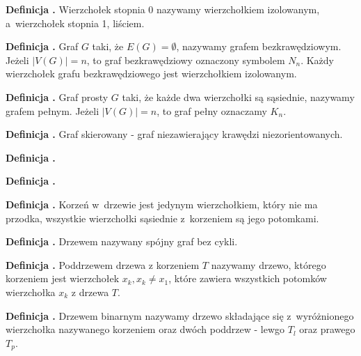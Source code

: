 \noindent
\textbf{Definicja .}
\incrementdefinitionIndex
Wierzchołek stopnia 0 nazywamy wierzchołkiem izolowanym, a~wierzchołek stopnia 1, liściem.

\noindent
\textbf{Definicja .}
\incrementdefinitionIndex
Graf $G$ taki, że $E(G) = \emptyset$, nazywamy grafem bezkrawędziowym. Jeżeli $|V(G)| = n$, to graf bezkrawędziowy oznaczony symbolem $N_n$.
Każdy wierzchołek grafu bezkrawędziowego jest wierzchołkiem izolowanym.

\noindent
\textbf{Definicja .}
\incrementdefinitionIndex
Graf prosty $G$ taki, że każde dwa wierzchołki są sąsiednie, nazywamy grafem pełnym.
Jeżeli $|V(G)| = n$, to graf pełny oznaczamy $K_n$.

\noindent
\textbf{Definicja .}
\incrementdefinitionIndex
Graf skierowany - graf niezawierający krawędzi niezorientowanych.

\noindent
\textbf{Definicja .}
\incrementdefinitionIndex

\noindent
\textbf{Definicja .}
\incrementdefinitionIndex

\noindent
\textbf{Definicja .}
\incrementdefinitionIndex
Korzeń w~drzewie jest jedynym wierzchołkiem,
który nie ma przodka, wszystkie wierzchołki sąsiednie z~korzeniem są jego potomkami.

\noindent
\textbf{Definicja .}
\incrementdefinitionIndex
Drzewem nazywany spójny graf bez cykli.

\noindent
\textbf{Definicja .}
\incrementdefinitionIndex
Poddrzewem drzewa z korzeniem $T$ nazywamy drzewo, którego korzeniem jest wierzchołek $x_k, x_k \neq x_1$,
które zawiera wszystkich potomków wierzchołka $x_k$ z drzewa $T$.

\noindent
\textbf{Definicja .}
\incrementdefinitionIndex
Drzewem binarnym nazywamy drzewo składające się z~wyróżnionego wierzchołka nazywanego korzeniem oraz dwóch poddrzew
- lewgo $T_l$ oraz prawego $T_p$.